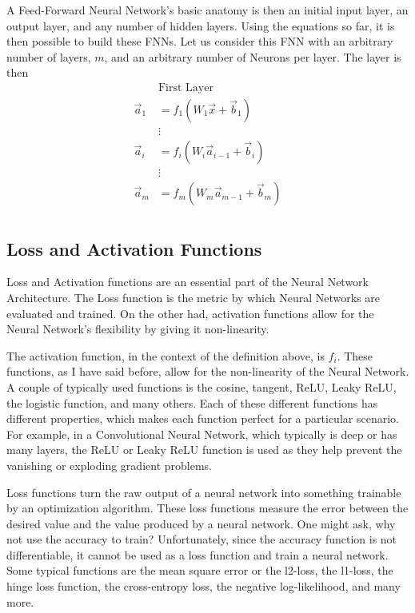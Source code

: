 \documentclass{article}
\begin{document}
A Feed-Forward Neural Network's basic anatomy is then an initial input layer, an output layer, and any number of hidden layers. Using the equations so far, it is then possible to build these FNNs. Let us consider this FNN with an arbitrary number of layers, $m$, and an arbitrary number of Neurons per layer. The layer is then 
\begin{align*}
&\text{First Layer} \\
\vec{a}_1 &= f_1(W_1\vec{x} +\vec{b}_1 )\\
&\vdots\\
\vec{a}_i &= f_i(W_i\vec{a}_{i-1}+\vec{b}_i)\\
&\vdots\\
\vec{a}_m &= f_m(W_m\vec{a}_{m-1}+\vec{b}_m)\\
\end{align*}

\subsection{Loss and Activation Functions}

Loss and Activation functions are an essential part of the Neural Network Architecture. The Loss function is the metric by which Neural Networks are evaluated and trained. On the other had, activation functions allow for the Neural Network's flexibility by giving it non-linearity.

The activation function, in the context of the definition above, is $f_i$. These functions, as I have said before, allow for the non-linearity of the Neural Network. A couple of typically used functions is the cosine, tangent, ReLU, Leaky ReLU, the logistic function, and many others. Each of these different functions has different properties, which makes each function perfect for a particular scenario. For example, in a Convolutional Neural Network, which typically is deep or has many layers, the ReLU or Leaky ReLU function is used as they help prevent the vanishing or exploding gradient problems.

Loss functions turn the raw output of a neural network into something trainable by an optimization algorithm. These loss functions measure the error between the desired value and the value produced by a neural network. One might ask, why not use the accuracy to train? Unfortunately, since the accuracy function is not differentiable, it cannot be used as a loss function and train a neural network. Some typical functions are the mean square error or the l2-loss, the l1-loss, the hinge loss function, the cross-entropy loss, the negative log-likelihood, and many more.
\end{document}
